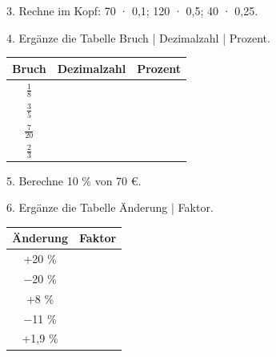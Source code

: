 \documentclass[11pt]{article}
\begin{document}
\begin{pfaufg}{}{3.}{}
Rechne im Kopf: 70 · 0,1; 120 · 0,5; 40 · 0,25.
\end{pfaufg}
\begin{pfaufg}{}{4.}{}
Ergänze die Tabelle Bruch | Dezimalzahl | Prozent.
\par\smallskip\noindent \begingroup\renewcommand{\arraystretch}{1.3}\begin{tabular}{|c|c|c|}\hline \textbf{Bruch} & \textbf{Dezimalzahl} & \textbf{Prozent} \\ \hline $\tfrac{1}{8}$ & \rule{0pt}{3ex}\hspace{1.6cm} & \rule{0pt}{3ex}\hspace{1.6cm} \\ \hline $\tfrac{3}{5}$ & \rule{0pt}{3ex}\hspace{1.6cm} & \rule{0pt}{3ex}\hspace{1.6cm} \\ \hline $\tfrac{7}{20}$ & \rule{0pt}{3ex}\hspace{1.6cm} & \rule{0pt}{3ex}\hspace{1.6cm} \\ \hline $\tfrac{2}{3}$ & \rule{0pt}{3ex}\hspace{1.6cm} & \rule{0pt}{3ex}\hspace{1.6cm} \\ \hline\end{tabular}\endgroup\par
{}
\end{pfaufg}
\begin{pfaufg}{}{5.}{}
Berechne 10 \% von 70 €.
\end{pfaufg}
\begin{pfaufg}{}{6.}{}
Ergänze die Tabelle Änderung | Faktor.
\par\smallskip\noindent \begingroup\renewcommand{\arraystretch}{1.3}\begin{tabular}{|c|c|}\hline \textbf{Änderung} & \textbf{Faktor} \\ \hline +20 \% & \rule{0pt}{3ex}\hspace{1.6cm} \\ \hline $-$20 \% & \rule{0pt}{3ex}\hspace{1.6cm} \\ \hline +8 \% & \rule{0pt}{3ex}\hspace{1.6cm} \\ \hline $-$11 \% & \rule{0pt}{3ex}\hspace{1.6cm} \\ \hline +1,9 \% & \rule{0pt}{3ex}\hspace{1.6cm} \\ \hline\end{tabular}\endgroup\par
{}
\end{pfaufg}
\end{document}

